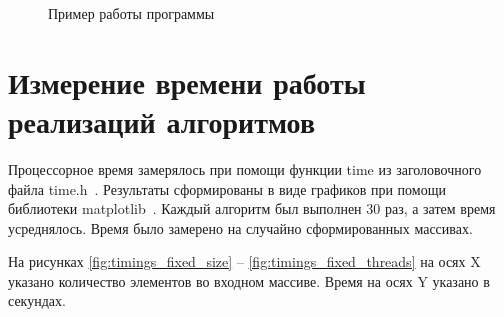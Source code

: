 \begin{figure}[ph!]
	\caption{Пример работы программы}
	\label{img:example}
\end{figure}

\section{Измерение времени работы реализаций алгоритмов}

Процессорное время замерялось при помощи функции time из заголовочного файла time.h~\cite{cplusplus}. Результаты сформированы в виде графиков при помощи библиотеки matplotlib~\cite{matplotlib}.  Каждый алгоритм был выполнен 30 раз, а затем время усреднялось.
Время было замерено на случайно сформированных массивах.

На рисунках \ref{fig:timings_fixed_size} -- \ref{fig:timings_fixed_threads} на осях X указано количество элементов во входном массиве. Время на осях Y указано в секундах.


